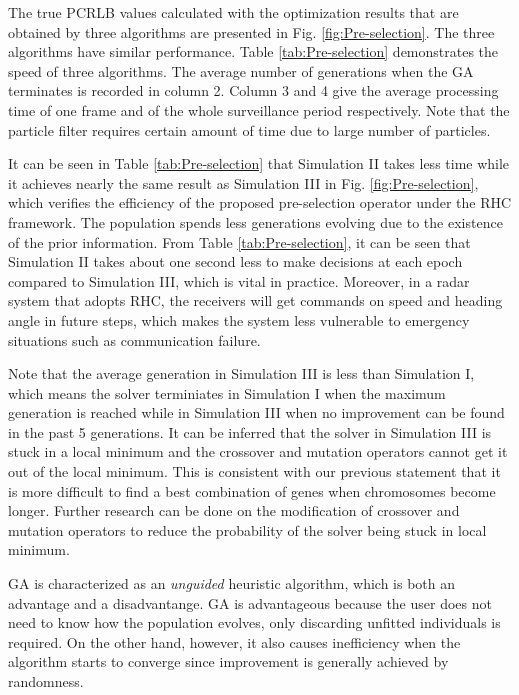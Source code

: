 \documentclass[12pt,journal,draftclsnofoot,onecolumn]{IEEEtran}
\begin{document}
The true PCRLB values calculated with the optimization results that are obtained by three algorithms are presented in Fig. \ref{fig:Pre-selection}. The three algorithms have similar performance. Table \ref{tab:Pre-selection} demonstrates the speed of three algorithms. The average number of generations when the GA terminates is recorded in column 2. Column 3 and 4 give the average processing time of one frame and of the whole surveillance period respectively. Note that the particle filter requires certain amount of time due to large number of particles.

It can be seen in Table \ref{tab:Pre-selection} that Simulation II takes less time while it achieves nearly the same result as Simulation III in Fig. \ref{fig:Pre-selection}, which verifies the efficiency of the proposed pre-selection operator under the RHC framework. The population spends less generations evolving due to the existence of the prior information. From Table \ref{tab:Pre-selection},  it can be seen that Simulation II takes about one second less to make decisions at each epoch compared to Simulation III, which is vital in practice. Moreover, in a radar system that adopts RHC, the receivers will get commands on speed and heading angle in future steps, which makes the system less vulnerable to emergency situations such as communication failure. %

Note that the average generation in Simulation III is less than Simulation I, which means the solver terminiates in Simulation I when the maximum generation is reached while in Simulation III when no improvement can be found in the past 5 generations. It can be inferred that the solver in Simulation III is stuck in a local minimum and the crossover and mutation operators cannot get it out of the local minimum. This is consistent with our previous statement that it is more difficult to find a best combination of genes when chromosomes become longer. Further research can be done on the modification of crossover and mutation operators to reduce the probability of the solver being stuck in local minimum. 

GA is characterized as an \emph{unguided} heuristic algorithm, which is both an advantage and a disadvantange. GA is advantageous because the user does not need to know how the population evolves, only discarding unfitted individuals is required. On the other hand, however, it also causes inefficiency when the algorithm starts to converge since improvement is generally achieved by randomness. 
\end{document}
